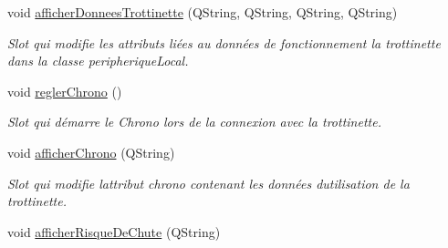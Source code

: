 \begin{DoxyCompactItemize}
void \hyperlink{class_peripherique_local_a5702930929fea3e197fc1938a2303961}{afficher\+Donnees\+Trottinette} (Q\+String, Q\+String, Q\+String, Q\+String)
\begin{DoxyCompactList}\small\item\em Slot qui modifie les attributs liées au données de fonctionnement la trottinette dans la classe peripherique\+Local. \end{DoxyCompactList}\item 
void \hyperlink{class_peripherique_local_ae4f8521445a9dc3a51ff116e1f6597d7}{regler\+Chrono} ()
\begin{DoxyCompactList}\small\item\em Slot qui démarre le Chrono lors de la connexion avec la trottinette. \end{DoxyCompactList}\item 
void \hyperlink{class_peripherique_local_af567be15ff8eb2a00cb4e0674ebf3004}{afficher\+Chrono} (Q\+String)
\begin{DoxyCompactList}\small\item\em Slot qui modifie l\textquotesingle{}attribut chrono contenant les données d\textquotesingle{}utilisation de la trottinette. \end{DoxyCompactList}\item 
void \hyperlink{class_peripherique_local_ac20ba20d69997e441b1b782f8b506291}{afficher\+Risque\+De\+Chute} (Q\+String)
\end{DoxyCompactItemize}
